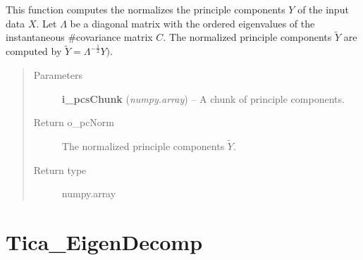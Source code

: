 \documentclass[letterpaper,10pt,english]{sphinxmanual}
\begin{document}
\begin{fulllineitems}
\begin{fulllineitems}
\label{tica:Tica_PrincipleComp.TicaPrinComp.normalizePCs}
This function computes the normalizes the principle components \(Y\) of the input data \(X\).
Let \(\Lambda\) be a diagonal matrix with the ordered eigenvalues of the instantaneous
\#covariance matrix \(C\). The normalized principle components \(\tilde{Y}\) are computed
by \(\tilde{Y} = \Lambda^{-\frac{1}{2}}Y)\).
\begin{quote}\begin{description}
\item[{Parameters}] \leavevmode
\textbf{i\_pcsChunk} (\emph{numpy.array}) -- A chunk of principle components.

\item[{Return o\_pcNorm}] \leavevmode
The normalized principle components \(\tilde{Y}\).

\item[{Return type}] \leavevmode
numpy.array

\end{description}\end{quote}

\end{fulllineitems}


\end{fulllineitems}



\section{Tica\_EigenDecomp}
\label{tica:tica-eigendecomp}\label{tica:module-Tica_EigenDecomp}
\end{document}
